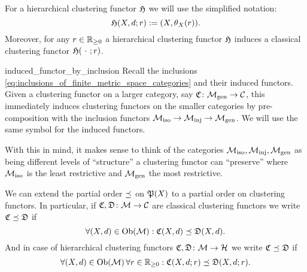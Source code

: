 For a hierarchical clustering functor $\Hf$ we will use the simplified notation:
$$
\Hf(X,d;r) := (X,\theta_X(r)).
$$
Moreover, for any $r \in \R_{\geq0}$ a hierarchical clustering functor $\Hf$ induces a classical clustering functor $\Hf(\ \cdot \ ;r)$.

\begin{myremark}{}{induced_functor_by_inclusion}
Recall the inclusions \eqref{eq:inclusions_of_finite_metric_space_categories} and their induced functors.
Given a clustering functor on a larger category, say $\Cf\colon \gen \to \C$, this immediately induces clustering functors on the smaller categories by pre-composition with the inclusion functors $\iso \to \inj \to \gen$. We will use the same symbol for the induced functors.
\end{myremark}

With this in mind, it makes sense to think of the categories $\iso, \inj, \gen$ as being different levels of ``structure'' a clustering functor can ``preserve'' where $\iso$ is the least restrictive and $\gen$ the most restrictive.


\begin{myremark}{}{}
We can extend the partial order $\refines$ on $\P(X)$ to a partial order on clustering functors.
In particular, if $\Cf, \mathfrak{D}\colon \M \to \C$ are classical clustering functors we write $\Cf \refines \mathfrak{D}$ if
\begin{equation*}
    \forall (X,d) \in \ob(\M): \Cf(X,d) \refines \mathfrak{D}(X,d).
\end{equation*}
And in case of hierarchical clustering functors $\Cf, \mathfrak{D}\colon \M \to \H$ we write $\Cf \refines \mathfrak{D}$ if
\begin{equation*}
    \forall (X,d) \in \ob(\M) \, \forall r \in \R_{\geq0}: \Cf(X,d;r) \refines \mathfrak{D}(X,d;r).
\end{equation*}
\end{myremark}